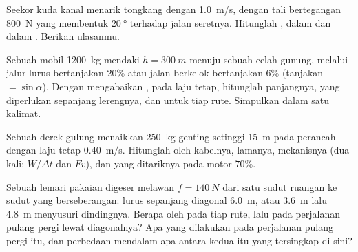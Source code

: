 \begin{exercise}[$\star\star$]\label{exo:g11:work-of-force:11}
Seekor kuda kanal menarik tongkang dengan \qty{1.0}{m/s}, dengan tali
bertegangan \qty{800}{N} yang membentuk $\qty{20}{\degree}$ terhadap
jalan seretnya. Hitunglah , dalam  dan dalam .
Berikan ulasanmu.
\end{exercise}

\begin{exercise}[$\star\star\star$]\label{exo:g11:work-of-force:12}
Sebuah mobil \qty{1200}{kg} mendaki $h = \qty{300}{m}$ menuju sebuah
celah gunung, melalui jalur lurus bertanjakan $20\%$ atau jalan
berkelok bertanjakan $6\%$ (tanjakan $=
\sin\alpha$). Dengan
mengabaikan , pada laju tetap, hitunglah panjangnya,  yang
diperlukan sepanjang lerengnya, dan  untuk tiap rute.
Simpulkan dalam satu kalimat.
\end{exercise}

\begin{exercise}[$\star\star\star$]\label{exo:g11:work-of-force:13}
Sebuah derek gulung menaikkan \qty{250}{kg} genting setinggi \qty{15}{m}
pada perancah dengan laju tetap \qty{0.40}{m/s}. Hitunglah  oleh
 kabelnya, lamanya,  mekanisnya (dua kali: $W/\Delta t$ dan
$Fv$), dan  yang ditariknya pada  motor $70\%$.
\end{exercise}

\begin{exercise}[$\star\star\star$]\label{exo:g11:work-of-force:14}
Sebuah lemari pakaian digeser melawan  $f = \qty{140}{N}$ dari
satu sudut ruangan ke sudut yang berseberangan: lurus sepanjang
diagonal \qty{6.0}{m}, atau \qty{3.6}{m} lalu \qty{4.8}{m} menyusuri
dindingnya. Berapa  oleh  pada tiap rute, lalu pada
perjalanan pulang pergi lewat diagonalnya? Apa yang dilakukan 
pada perjalanan pulang pergi itu, dan perbedaan mendalam apa antara
kedua  itu yang tersingkap di sini?
\end{exercise}

